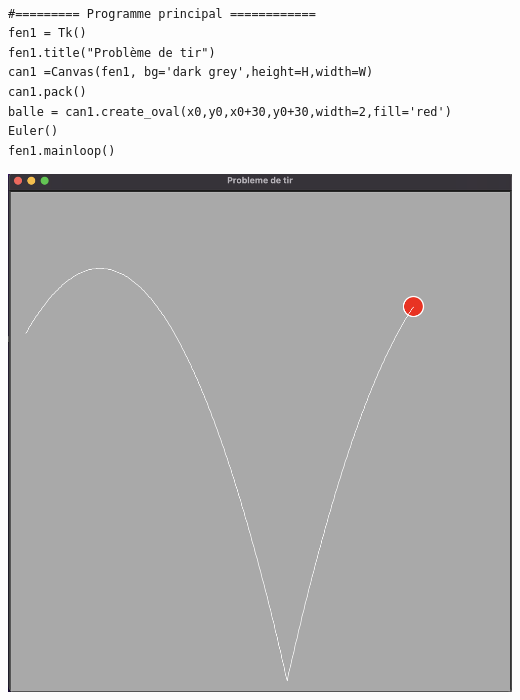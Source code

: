 \documentclass{beamer}
\begin{document}
\begin{frame}[fragile]

\begin{verbatim}

#========= Programme principal ============
fen1 = Tk()
fen1.title("Problème de tir")
can1 =Canvas(fen1, bg='dark grey',height=H,width=W)
can1.pack()
balle = can1.create_oval(x0,y0,x0+30,y0+30,width=2,fill='red')
Euler()
fen1.mainloop()
\end{verbatim}
\end{frame}
\begin{frame}
\begin{center}
\includegraphics[scale=0.30]{images/codePbmDeTir03.png} 
\end{center}

\end{frame}

  
\end{document}
